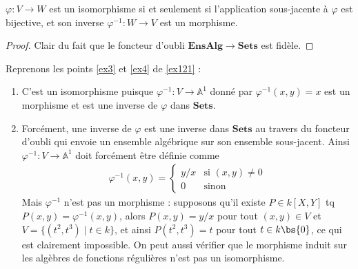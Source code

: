             \begin{prop}
                $\varphi : V \to W$ est un isomorphisme si et seulement si l'application sous-jacente à $\varphi$ est bijective, et son inverse $\varphi^{-1} : W \to V$ est un morphisme.
            \end{prop}
            \begin{proof}
                Clair du fait que le foncteur d'oubli $\mathbf{EnsAlg} \to \mathbf{Sets}$ est fidèle.
            \end{proof}
            \begin{expl}
                Reprenons les points \ref{ex3} et \ref{ex4} de \ref{ex121} :
                \begin{enumerate} \addtocounter{enumi}{2}
                    \item C'est un isomorphisme puisque $\varphi^{-1} : V \to \mathbb{A}^1$ donné par $\varphi^{-1}(x,y) = x$ est un morphisme et est une inverse de $\varphi$ dans $\mathbf{Sets}$.
                    \item Forcément, une inverse de $\varphi$ est une inverse dans $\mathbf{Sets}$ au travers du foncteur d'oubli qui envoie un ensemble algébrique sur son ensemble sous-jacent. Ainsi $\varphi^{-1} : V \to \mathbb{A}^1$ doit forcément être définie comme
                    \begin{align*}
                        \varphi^{-1}(x,y) = 
                        \begin{cases}
                            y/x & \text{si } (x,y) \neq 0 \\
                            0 & \text{sinon}
                        \end{cases}
                    \end{align*}
                    Mais $\varphi^{-1}$ n'est pas un morphisme : supposons qu'il existe $P \in k[X,Y]$ tq $P(x,y) = \varphi^{-1}(x,y)$, alors $P(x,y) = y/x$ pour tout $(x,y) \in V$ et $V = \{(t^2, t^3) \mid t \in k \}$, et ainsi $P(t^2, t^3) = t$ pour tout $t \in k \bs \{0\}$, ce qui est clairement impossible. On peut aussi vérifier que le morphisme induit sur les algèbres de fonctions régulières n'est pas un isomorphisme.
                \end{enumerate}
            \end{expl}
            
